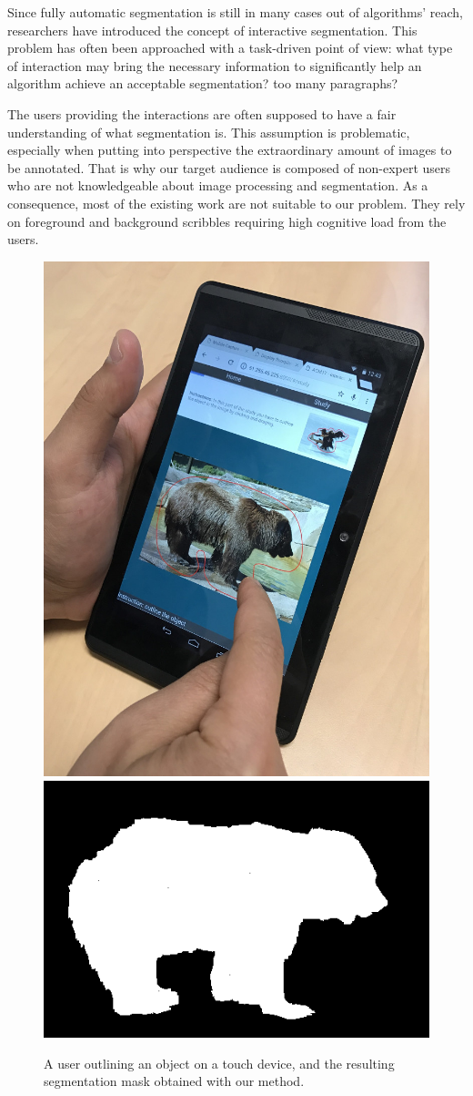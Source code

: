 Since fully automatic segmentation is still in many cases
out of algorithms' reach, researchers have introduced
the concept of interactive segmentation.
This problem has often been approached with a task-driven point of view:
what type of interaction may bring the necessary information
to significantly help an algorithm achieve an acceptable segmentation?
\alert{too many paragraphs?}

The users providing the interactions are often supposed
to have a fair understanding of what segmentation is.
This assumption is problematic, especially when putting
into perspective the extraordinary amount of images to be annotated.
That is why our target audience is composed
of non-expert users who are not knowledgeable
about image processing and segmentation.
As a consequence, most of the existing work are not suitable to our problem.
They rely on foreground and background scribbles
requiring high cognitive load from the users.


\begin{figure}[h]
\centering
\includegraphics[width=0.4\columnwidth]{assets/img/photo_tablet.jpg}
\hfill
\includegraphics[width=0.55\columnwidth]{assets/img/bear_02_mask.png}
\caption{A user outlining an object on a touch device,
and the resulting segmentation mask obtained with our method.}%
\label{fig:bigpicture}
\end{figure}



